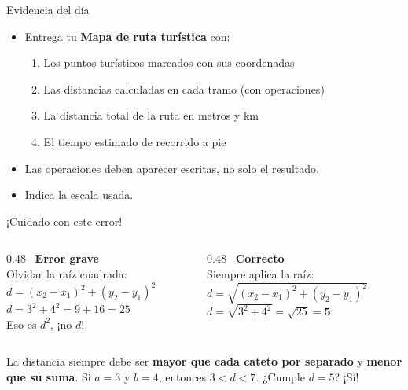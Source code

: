 \documentclass[aspectratio=169, 10pt, spanish]{beamer}
\begin{document}
\begin{frame}{Evidencia del día}
  \begin{evidenciabox}
    \begin{itemize}
      \item Entrega tu \textbf{Mapa de ruta turística} con:
        \begin{enumerate}
          \item Los puntos turísticos marcados con sus coordenadas
          \item Las distancias calculadas en cada tramo (con operaciones)
          \item La distancia total de la ruta en metros y km
          \item El tiempo estimado de recorrido a pie
        \end{enumerate}
      \item Las operaciones deben aparecer escritas, no solo el resultado.
      \item Indica la escala usada.
    \end{itemize}
  \end{evidenciabox}
\end{frame}

\begin{frame}{¡Cuidado con este error!}
  \begin{errorbox}
    \begin{columns}[c]
      \begin{column}{0.48\textwidth}
        \incorrecto\ \textbf{Error grave}\\[4pt]
        Olvidar la raíz cuadrada:\\[4pt]
        $d = (x_2-x_1)^2 + (y_2-y_1)^2$\\
        $d = 3^2 + 4^2 = 9+16 = 25$\\[4pt]
        \textcolor{AlmTerra}{Eso es $d^2$, ¡no $d$!}
      \end{column}
      \begin{column}{0.48\textwidth}
        \correcto\ \textbf{Correcto}\\[4pt]
        Siempre aplica la raíz:\\[4pt]
        $d = \sqrt{(x_2-x_1)^2+(y_2-y_1)^2}$\\
        $d = \sqrt{3^2+4^2} = \sqrt{25} = \mathbf{5}$
      \end{column}
    \end{columns}
  \end{errorbox}
  \vspace{6pt}
  \begin{notabox}
    \AlmFontSmall
    La distancia siempre debe ser \textbf{mayor que cada cateto
    por separado} y \textbf{menor que su suma}.
    Si $a=3$ y $b=4$, entonces $3 < d < 7$. ¿Cumple $d=5$? ¡Sí!
  \end{notabox}
\end{frame}
\end{document}
